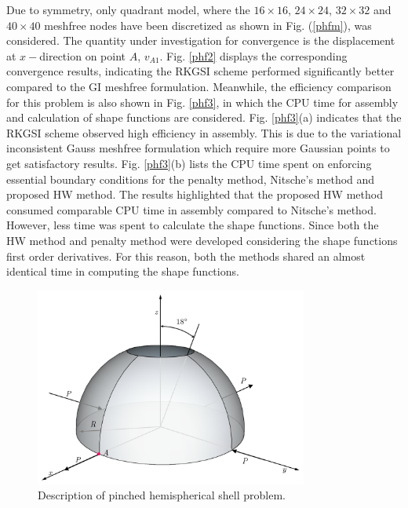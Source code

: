 Due to symmetry, only quadrant model, where the $16\times16$, $24\times24$, $32\times32$ and $40\times40$ meshfree nodes have been discretized as shown in Fig. (\ref{phfm}), was considered. The quantity under investigation for convergence is the displacement at $x-$direction on point $A$, $v_{A1}$.
Fig. \ref{phf2} displays the corresponding convergence results, indicating the RKGSI scheme performed significantly better compared to the GI meshfree formulation. Meanwhile, the efficiency comparison for this problem is also shown in Fig. \ref{phf3}, in which the CPU time for assembly and calculation of shape functions are considered. Fig. \ref{phf3}(a) indicates that the RKGSI scheme observed high efficiency in assembly. This is due to the variational inconsistent Gauss meshfree formulation which require more Gaussian points to get satisfactory results. Fig. \ref{phf3}(b) lists the CPU time spent on enforcing essential boundary conditions for the penalty method, Nitsche's method and proposed HW method. The results highlighted that the proposed HW method consumed comparable CPU time in assembly compared to Nitsche's method. However, less time was spent to calculate the shape functions. Since both the HW method and penalty method were developed considering the shape functions first order derivatives. For this reason, both the methods shared an almost identical time in computing the shape functions.
\begin{figure}[!ht]
\centering
\includegraphics[width=0.8\textwidth]{figures/pfm}
\caption{Description of pinched hemispherical shell problem.}\label{phf1}
\end{figure}
